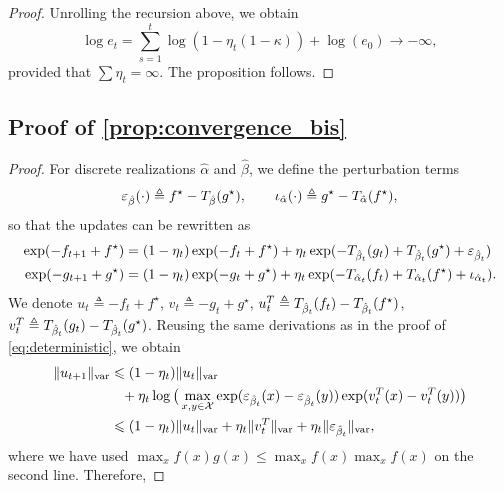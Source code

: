 \begin{proof}
    Unrolling the recursion above, we obtain
    \begin{equation}
        \log e_t = \sum_{s=1}^t \log(1 - \eta_t (1 - \kappa)) + \log(e_0) \to - \infty,
    \end{equation}
    provided that $\sum \eta_t = \infty$. The proposition follows.
\end{proof}

\subsection{Proof of \autoref{prop:convergence_bis}}

\begin{proof}
For discrete realizations $\hat \alpha$ and $\hat \beta$, we define the perturbation terms
\begin{equation}
    \epsilon_{\hat \beta}(\cdot) \triangleq
    f^\star - \Ctrans{g^\star}{\hat \beta} ,\qquad
    \iota_{\hat \alpha}(\cdot) \triangleq 
    g^\star - \Ctrans{f^\star}{\hat \alpha},
\end{equation}
so that the updates can be rewritten as
\begin{align}
    \exp(-f_{t+1} + f^\star) &= (1 - \eta_t)
    \exp(-f_{t} + f^\star)
    + \eta_t \exp(-\Ctrans{g_t}{\hat \beta_t} 
    +\Ctrans{g^\star}{\hat \beta_t} + \epsilon_{\hat \beta_t}) \\
    \exp(-g_{t+1} + g^\star) &= (1 - \eta_t)
    \exp(-g_{t} + g^\star)
    + \eta_t \exp(-\Ctrans{f_t}{\hat \alpha_t} 
    +\Ctrans{f^\star}{\hat \alpha_t} + \iota_{\hat \alpha_t}).
\end{align}
We denote $u_t \triangleq -f_{t} + f^\star$, $v_t \triangleq -g_{t} + g^\star$, $u_t^T \triangleq
\Ctrans{f_t}{\hat \beta_t} - \Ctrans{f^\star}{\hat \beta_t}$, $v_t^T \triangleq
\Ctrans{g_t}{\hat \beta_t} - \Ctrans{g^\star}{\hat \beta_t}$. Reusing the same
derivations as in the proof of \autoref{eq:deterministic}, we obtain
    \label{eq:pre_ineq_var}
    \begin{align}
    \Vert u_{t+1} \Vert_{\var} &\leq
    (1 - \eta_t) \Vert u_t \Vert_{\var}
    \\
    &\phantom{=}+ \eta_t \log \big( \max_{x, y \in \Xx}
    \exp(\epsilon_{\hat \beta_t}(x) 
    - \epsilon_{\hat \beta_t}(y)) \exp(v_t^T(x) - v_t^T(y)) \big) \\ 
    &\leq
    (1 - \eta_t) \Vert u_t \Vert_{\var}
    + \eta_t \Vert v_t^T \Vert_{\var}
    + \eta_t \Vert \epsilon_{\hat \beta_t} \Vert_{\var},
\end{align}
where we have used $\max_x f(x) g(x) \leq \max_x f(x) \max_x f(x)$ on the second line. Therefore,

\end{proof}
